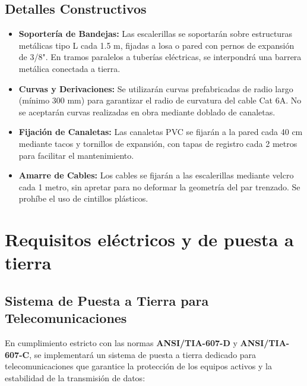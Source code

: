 \subsection*{Detalles Constructivos}

\begin{itemize}
    \item \textbf{Soportería de Bandejas:} Las escalerillas se soportarán sobre estructuras metálicas tipo L cada 1.5 m, fijadas a losa o pared con pernos de expansión de 3/8". En tramos paralelos a tuberías eléctricas, se interpondrá una barrera metálica conectada a tierra.
    \item \textbf{Curvas y Derivaciones:} Se utilizarán curvas prefabricadas de radio largo (mínimo 300 mm) para garantizar el radio de curvatura del cable Cat 6A. No se aceptarán curvas realizadas en obra mediante doblado de canaletas.
    \item \textbf{Fijación de Canaletas:} Las canaletas PVC se fijarán a la pared cada 40 cm mediante tacos y tornillos de expansión, con tapas de registro cada 2 metros para facilitar el mantenimiento.
    \item \textbf{Amarre de Cables:} Los cables se fijarán a las escalerillas mediante velcro cada 1 metro, sin apretar para no deformar la geometría del par trenzado. Se prohíbe el uso de cintillos plásticos.
\end{itemize}

\section{Requisitos eléctricos y de puesta a tierra}

\subsection*{Sistema de Puesta a Tierra para Telecomunicaciones}

En cumplimiento estricto con las normas \textbf{ANSI/TIA-607-D} y \textbf{ANSI/TIA-607-C}, se implementará un sistema de puesta a tierra dedicado para telecomunicaciones que garantice la protección de los equipos activos y la estabilidad de la transmisión de datos:

